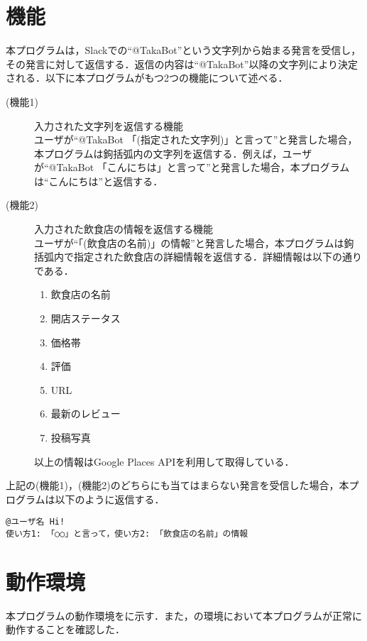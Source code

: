 \documentclass[12pt]{jsarticle}
\begin{document}
\section{機能}
\label{sec:function}
本プログラムは，Slackでの``@TakaBot''という文字列から始まる発言を受信し，その発言に対して返信する．返信の内容は``@TakaBot''以降の文字列により決定される．以下に本プログラムがもつ2つの機能について述べる．
\begin{description}
\item[(機能1)]  入力された文字列を返信する機能 \\
  ユーザが``@TakaBot 「(指定された文字列)」と言って''と発言した場合，本プログラムは鉤括弧内の文字列を返信する．例えば，ユーザが``@TakaBot 「こんにちは」と言って''と発言した場合，本プログラムは``こんにちは''と返信する．

\item[(機能2)]  入力された飲食店の情報を返信する機能 \\
  ユーザが``「(飲食店の名前)」の情報''と発言した場合，本プログラムは鉤括弧内で指定された飲食店の詳細情報を返信する．詳細情報は以下の通りである．
\newpage
  \begin{enumerate}
  \item 飲食店の名前
  \item 開店ステータス
  \item 価格帯
  \item 評価
  \item URL
  \item 最新のレビュー
  \item 投稿写真
  \end{enumerate}
  以上の情報はGoogle Places API\cite{placesapi}を利用して取得している．
\end{description}
上記の(機能1)，(機能2)のどちらにも当てはまらない発言を受信した場合，本プログラムは以下のように返信する．

\begin{verbatim}
@ユーザ名 Hi!
使い方1: 「○○」と言って，使い方2: 「飲食店の名前」の情報
\end{verbatim}

\section{動作環境}
\label{sec:devenv}
本プログラムの動作環境をに示す．また，の環境において本プログラムが正常に動作することを確認した．
\end{document}
